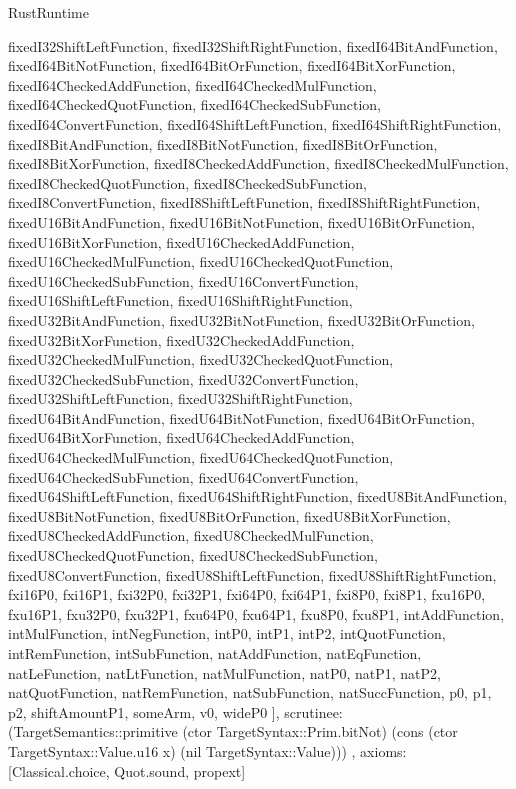 \begin{lexlean}{RustRuntime}
\begin{semanticmodule}
{{      fixedI32ShiftLeftFunction,
      fixedI32ShiftRightFunction,
      fixedI64BitAndFunction,
      fixedI64BitNotFunction,
      fixedI64BitOrFunction,
      fixedI64BitXorFunction,
      fixedI64CheckedAddFunction,
      fixedI64CheckedMulFunction,
      fixedI64CheckedQuotFunction,
      fixedI64CheckedSubFunction,
      fixedI64ConvertFunction,
      fixedI64ShiftLeftFunction,
      fixedI64ShiftRightFunction,
      fixedI8BitAndFunction,
      fixedI8BitNotFunction,
      fixedI8BitOrFunction,
      fixedI8BitXorFunction,
      fixedI8CheckedAddFunction,
      fixedI8CheckedMulFunction,
      fixedI8CheckedQuotFunction,
      fixedI8CheckedSubFunction,
      fixedI8ConvertFunction,
      fixedI8ShiftLeftFunction,
      fixedI8ShiftRightFunction,
      fixedU16BitAndFunction,
      fixedU16BitNotFunction,
      fixedU16BitOrFunction,
      fixedU16BitXorFunction,
      fixedU16CheckedAddFunction,
      fixedU16CheckedMulFunction,
      fixedU16CheckedQuotFunction,
      fixedU16CheckedSubFunction,
      fixedU16ConvertFunction,
      fixedU16ShiftLeftFunction,
      fixedU16ShiftRightFunction,
      fixedU32BitAndFunction,
      fixedU32BitNotFunction,
      fixedU32BitOrFunction,
      fixedU32BitXorFunction,
      fixedU32CheckedAddFunction,
      fixedU32CheckedMulFunction,
      fixedU32CheckedQuotFunction,
      fixedU32CheckedSubFunction,
      fixedU32ConvertFunction,
      fixedU32ShiftLeftFunction,
      fixedU32ShiftRightFunction,
      fixedU64BitAndFunction,
      fixedU64BitNotFunction,
      fixedU64BitOrFunction,
      fixedU64BitXorFunction,
      fixedU64CheckedAddFunction,
      fixedU64CheckedMulFunction,
      fixedU64CheckedQuotFunction,
      fixedU64CheckedSubFunction,
      fixedU64ConvertFunction,
      fixedU64ShiftLeftFunction,
      fixedU64ShiftRightFunction,
      fixedU8BitAndFunction,
      fixedU8BitNotFunction,
      fixedU8BitOrFunction,
      fixedU8BitXorFunction,
      fixedU8CheckedAddFunction,
      fixedU8CheckedMulFunction,
      fixedU8CheckedQuotFunction,
      fixedU8CheckedSubFunction,
      fixedU8ConvertFunction,
      fixedU8ShiftLeftFunction,
      fixedU8ShiftRightFunction,
      fxi16P0,
      fxi16P1,
      fxi32P0,
      fxi32P1,
      fxi64P0,
      fxi64P1,
      fxi8P0,
      fxi8P1,
      fxu16P0,
      fxu16P1,
      fxu32P0,
      fxu32P1,
      fxu64P0,
      fxu64P1,
      fxu8P0,
      fxu8P1,
      intAddFunction,
      intMulFunction,
      intNegFunction,
      intP0,
      intP1,
      intP2,
      intQuotFunction,
      intRemFunction,
      intSubFunction,
      natAddFunction,
      natEqFunction,
      natLeFunction,
      natLtFunction,
      natMulFunction,
      natP0,
      natP1,
      natP2,
      natQuotFunction,
      natRemFunction,
      natSubFunction,
      natSuccFunction,
      p0,
      p1,
      p2,
      shiftAmountP1,
      someArm,
      v0,
      wideP0
    ],
    scrutinee: (TargetSemantics::primitive (ctor TargetSyntax::Prim.bitNot) (cons (ctor TargetSyntax::Value.u16 x) (nil TargetSyntax::Value)))
  },
  axioms: [Classical.choice, Quot.sound, propext]
}


\end{semanticmodule}
\end{lexlean}
